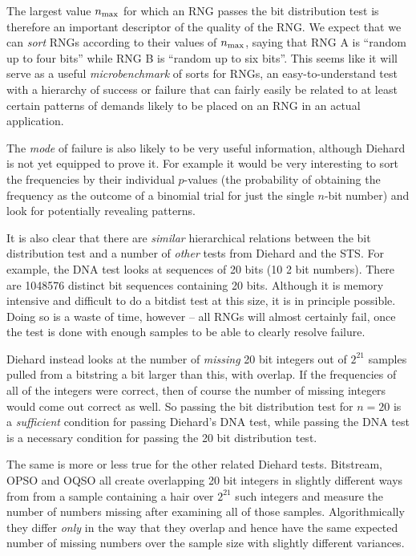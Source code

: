 \documentclass{book}
\begin{document}
The largest value $n_{\rm max}$ for which an RNG passes the bit
distribution test is therefore an important descriptor of the quality of
the RNG.  We expect that we can {\em sort} RNGs according to their
values of $n_{\rm max}$, saying that RNG A is ``random up to four bits''
while RNG B is ``random up to six bits''.  This seems like it will
serve as a useful {\em microbenchmark} of sorts for RNGs, an
easy-to-understand test with a hierarchy of success or failure that can
fairly easily be related to at least certain patterns of demands likely
to be placed on an RNG in an actual application.

The {\em mode} of failure is also likely to be very useful information,
although Diehard is not yet equipped to prove it.  For example it would
be very interesting to sort the frequencies by their individual
$p$-values (the probability of obtaining the frequency as the outcome of
a binomial trial for just the single $n$-bit number) and look for
potentially revealing patterns.

It is also clear that there are {\em similar} hierarchical relations
between the bit distribution test and a number of {\em other} tests from
Diehard and the STS.  For example, the DNA test looks at sequences of 20
bits (10 2 bit numbers).  There are 1048576 distinct bit sequences
containing 20 bits.  Although it is memory intensive and difficult to do
a bitdist test at this size, it is in principle possible.  Doing so is a
waste of time, however -- all RNGs will almost certainly fail, once the
test is done with enough samples to be able to clearly resolve failure.

Diehard instead looks at the number of {\em missing} 20 bit integers out
of $2^{21}$ samples pulled from a bitstring a bit larger than this, with
overlap.  If the frequencies of all of the integers were correct, then
of course the number of missing integers would come out correct as well.
So passing the bit distribution test for $n = 20$ is a {\em sufficient}
condition for passing Diehard's DNA test, while passing the DNA test is
a necessary condition for passing the 20 bit distribution test.  

The same is more or less true for the other related Diehard tests.
Bitstream, OPSO and OQSO all create overlapping 20 bit integers in
slightly different ways from from a sample containing a hair over
$2^{21}$ such integers and measure the number of numbers missing after
examining all of those samples.  Algorithmically they differ {\em only}
in the way that they overlap and hence have the same expected number of
missing numbers over the sample size with slightly different variances.
\end{document}

